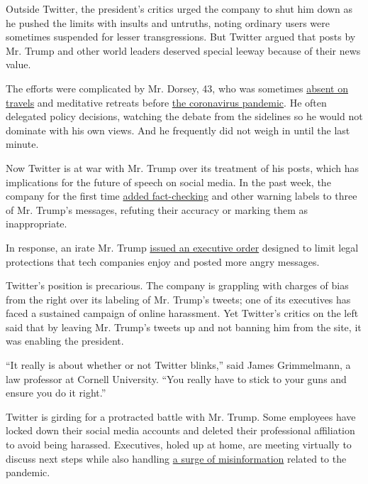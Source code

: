 Outside Twitter, the president's critics urged the company to shut him
down as he pushed the limits with insults and untruths, noting ordinary
users were sometimes suspended for lesser transgressions. But Twitter
argued that posts by Mr. Trump and other world leaders deserved special
leeway because of their news value.

The efforts were complicated by Mr. Dorsey, 43, who was sometimes
\href{https://www.nytimes3xbfgragh.onion/2020/02/29/business/dealbook/elliott-twitter-jack-dorsey.html}{absent
on travels} and meditative retreats before
\href{https://www.nytimes3xbfgragh.onion/news-event/coronavirus?action=click\&pgtype=Article\&state=default\&module=styln-coronavirus-national\&variant=show\&region=TOP_BANNER\&context=storylines_menu}{the
coronavirus pandemic}. He often delegated policy decisions, watching the
debate from the sidelines so he would not dominate with his own views.
And he frequently did not weigh in until the last minute.

Now Twitter is at war with Mr. Trump over its treatment of his posts,
which has implications for the future of speech on social media. In the
past week, the company for the first time
\href{https://www.nytimes3xbfgragh.onion/2020/05/26/technology/twitter-trump-mail-in-ballots.html}{added
fact-checking} and other warning labels to three of Mr. Trump's
messages, refuting their accuracy or marking them as inappropriate.

In response, an irate Mr. Trump
\href{https://www.nytimes3xbfgragh.onion/2020/05/28/us/politics/trump-jack-dorsey.html}{issued
an executive order} designed to limit legal protections that tech
companies enjoy and posted more angry messages.

Twitter's position is precarious. The company is grappling with charges
of bias from the right over its labeling of Mr. Trump's tweets; one of
its executives has faced a sustained campaign of online harassment. Yet
Twitter's critics on the left said that by leaving Mr. Trump's tweets up
and not banning him from the site, it was enabling the president.

``It really is about whether or not Twitter blinks,'' said James
Grimmelmann, a law professor at Cornell University. ``You really have to
stick to your guns and ensure you do it right.''

Twitter is girding for a protracted battle with Mr. Trump. Some
employees have locked down their social media accounts and deleted their
professional affiliation to avoid being harassed. Executives, holed up
at home, are meeting virtually to discuss next steps while also handling
\href{https://www.nytimes3xbfgragh.onion/2020/03/08/technology/coronavirus-misinformation-social-media.html}{a
surge of misinformation} related to the pandemic.

